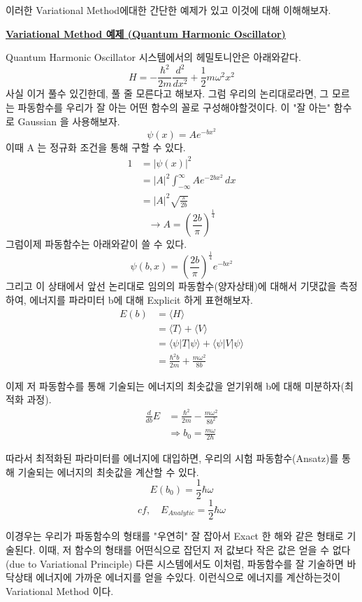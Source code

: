 \documentclass[10pt]{article}
\begin{document}
\begin{enumerate}[label=2)]
\begin{enumerate}[label=*]
\end{enumerate}

이러한 Variational Method에대한 간단한 예제가 있고 이것에 대해 이해해보자. 

\begin{mdframed}
\underline{\textbf{Variational Method 예제 (Quantum Harmonic Oscillator)}}

Quantum Harmonic Oscillator 시스템에서의 헤밀토니안은 아래와같다. 
\[H = -\frac{\hbar^2}{2m}\frac{d^2}{dx^2} + \frac{1}{2}m\omega^2 x^2 \]
사실 이거 풀수 있긴한데, 풀 줄 모른다고 해보자. 그럼 우리의 논리대로라면, 그 모르는 파동함수를 우리가 잘 아는 어떤 함수의 꼴로 구성해야할것이다. 
이 "잘 아는" 함수로 Gaussian 을 사용해보자. 
\[
\psi(x) = Ae^{-bx^2}
\]
이때 A 는 정규화 조건을 통해 구할 수 있다. 
\begin{align*}
1 &= |\psi(x)|^2  \\
&= |A|^2 \int_{-\infty}^{\infty} Ae^{-2bx^2} \, dx \\
&= |A|^2 \sqrt{\frac{\pi}{2b}}
\end{align*}
\[
\longrightarrow A = \left(\frac{2b}{\pi}\right)^{\frac{1}{4}}
\]
그럼이제 파동함수는 아래와같이 쓸 수 있다. 
\[
\psi(b,x) = \left(\frac{2b}{\pi}\right)^{\frac{1}{4}}e^{-bx^2}
\]
그리고 이 상태에서 앞선 논리대로 임의의 파동함수(양자상태)에 대해서 기댓값을 측정하여, 
에너지를 파라미터 b에 대해 Explicit 하게 표현해보자.
\begin{align*}
E(b) &= \langle H \rangle \\
&= \langle T \rangle + \langle V \rangle \\
&=\langle \psi|T|\psi \rangle + \langle \psi|V|\psi \rangle \\
&=\frac{\hbar^2 b}{2m} + \frac{m\omega^2}{8b}
\end{align*}


이제 저 파동함수를 통해 기술되는 에너지의 최솟값을 얻기위해 b에 대해 미분하자(최적화 과정). 
\begin{align*}
\frac{d}{db} E &= \frac{\hbar^2}{2m} - \frac{m \omega^2}{8b^2} \\
&\Longrightarrow b_0 = \frac{m\omega}{2\hbar}
\end{align*}

따라서 최적화된 파라미터를 에너지에 대입하면, 우리의 시험 파동함수(Ansatz)를 통해 기술되는 에너지의 최솟값을 계산할 수 있다. 
\[
E(b_0) = \frac{1}{2}\hbar\omega
\]
\[
cf, \quad E_{Analytic} = \frac{1}{2}\hbar\omega
\]
\end{mdframed}
이경우는 우리가 파동함수의 형태를 "우연히" 잘 잡아서 Exact 한 해와 같은 형태로 기술된다. 
이때, 저 함수의 형태를 어떤식으로 잡던지 저 값보다 작은 값은 얻을 수 없다(due to Variational Principle)
다른 시스템에서도 이처럼, 파동함수를 잘 기술하면 바닥상태 에너지에 가까운 에너지를 얻을 수있다. 
이런식으로 에너지를 계산하는것이 Variational Method 이다. 


\end{enumerate}
\end{document}
